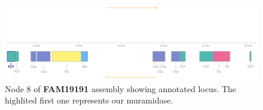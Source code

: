 \documentclass[10pt,a4paper]{article}
\begin{document}
\begin{figure}
	\centering
	\includegraphics[width=1\linewidth]{img/circular_genome_node8_annotated}
	\caption{Node 8 of \textbf{FAM19191} assembly showing annotated locus. The highlited first one represents our muramidase.}
	\label{fig:circulargenomenode8annotated}
\end{figure}
\end{document}
